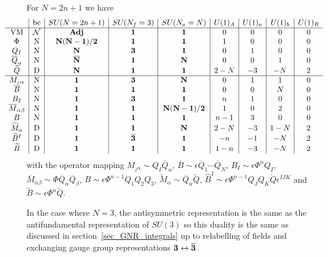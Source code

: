 \documentclass[12pt]{article}
\numberwithin{equation}{section}
\begin{document}
For $N=2n+1$ we have
\begin{align}
\hspace*{-1cm}
\label{SUN_odd_AS_charges}
\begin{array}{c|c|c|c|c|c|c|c|c}
& \textrm{bc} & SU(N = 2n+1) & SU(N_f = 3) & SU(N_a = N) & U(1)_A & U(1)_a & U(1)_b & U(1)_R \\ \hline
\textrm{VM} & \mathcal{N} & {\bf Adj} & {\bf 1} & {\bf 1} & 0 & 0 & 0 & 0 \\
\Phi & \textrm{N} & {\bf N(N-1)/2} & {\bf 1} & {\bf 1} & 1 & 0 & 0 & 0 \\
Q_I & \textrm{N} & {\bf N} & {\bf 3} & {\bf 1} & 0 & 1 & 0 & 0 \\
\overline{Q}_{\alpha} & \textrm{N} & {\bf \overline{N}} & {\bf 1} & {\bf N} & 0 & 0 & 1 & 0 \\
\widetilde{Q} & \textrm{D} & {\bf N} & {\bf 1} & {\bf 1} & 2 - N & -3 & -N & 2 \\
 \hline
M_{_I \alpha} & \textrm{N} & {\bf 1} & {\bf 3} & {\bf N} & 0 & 1 & 1 & 0 \\
\overline{B} & \textrm{N} & {\bf 1} & {\bf 1} & {\bf 1} & 0 & 0 & N & 0 \\
B_I & \textrm{N} & {\bf 1} & {\bf 3} & {\bf 1} & n & 1 & 0 & 0 \\
\overline{M}_{\alpha \beta} & \textrm{N} & {\bf 1} & {\bf 1} & {\bf N(N-1)/2} & 1 & 0 & 2 & 0 \\
B & \textrm{N} & {\bf 1} & {\bf 1} & {\bf 1} & n - 1 & 3 & 0 & 0 \\
\widetilde{M}_{\alpha} & \textrm{D} & {\bf 1} & {\bf 1} & {\bf N} & 2 - N & -3 & 1-N & 2 \\
\widehat{B}^I & \textrm{D} & {\bf 1} & {\bf \overline{3}} & {\bf 1} & -n & -1 & -N & 2 \\
\widetilde{B} & \textrm{D} & {\bf 1} & {\bf 1} & {\bf 1} & 1 - n & -3 & -N & 2
\end{array}
\end{align}
with the operator mapping $M_{_I \alpha} \sim Q_I \overline{Q}_{\alpha}$, $\overline{B} \sim \epsilon \overline{Q}_1 \cdots \overline{Q}_N$, $B_I \sim \epsilon \Phi^n Q_I$, $\overline{M}_{\alpha \beta} \sim \Phi \overline{Q}_{\alpha} \overline{Q}_{\beta}$, $B \sim \epsilon \Phi^{n-1} Q_1 Q_2 Q_3$, $\widetilde{M}_{\alpha} \sim \overline{Q}_{\alpha} \widetilde{Q}$, $\widehat{B}^I \sim \epsilon \Phi^{n-1} Q_J Q_K \widetilde{Q} \epsilon^{IJK}$ and $\widetilde{B} \sim \epsilon \Phi^n \widetilde{Q}$.

In the case where $N = 3$, the antisymmetric representation is the same as the antifundamental representation of $SU(3)$ so this duality is the same as discussed in section~\ref{sec_GNR_integrals} up to relabelling of fields and exchanging gauge group representations ${\bf 3} \leftrightarrow {\bf \overline{3}}$.
\end{document}
